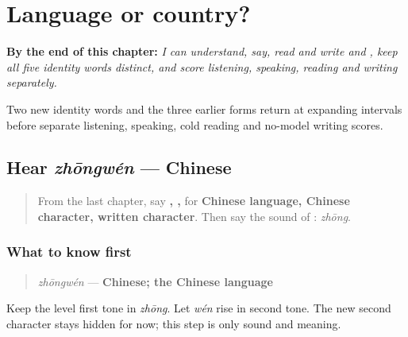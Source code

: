 
\chapter{Language or country?}
\label{ch:zh-language-country}

\begin{chapteropening}
\textbf{By the end of this chapter:} \emph{I can understand, say, read and write  and , keep all five identity words distinct, and score listening, speaking, reading and writing separately.}

Two new identity words and the three earlier forms return at expanding intervals before separate listening, speaking, cold reading and no-model writing scores.
\end{chapteropening}

\section[zhōngwén]{Hear \emph{zhōngwén} — Chinese}

\label{lesson:ZH-C17-hear-zhongwen}



\begin{quote}
From the last chapter, say \textbf{, , } for \textbf{Chinese language, Chinese character, written character}. Then say the sound of : \emph{zhōng}.
\end{quote}

\subsection*{What to know first}
\begin{quote}
\emph{zhōngwén} — \textbf{Chinese; the Chinese language}
\end{quote}

Keep the level first tone in \emph{zhōng}. Let \emph{wén} rise in second tone. The new second character stays hidden for now; this step is only sound and meaning.

